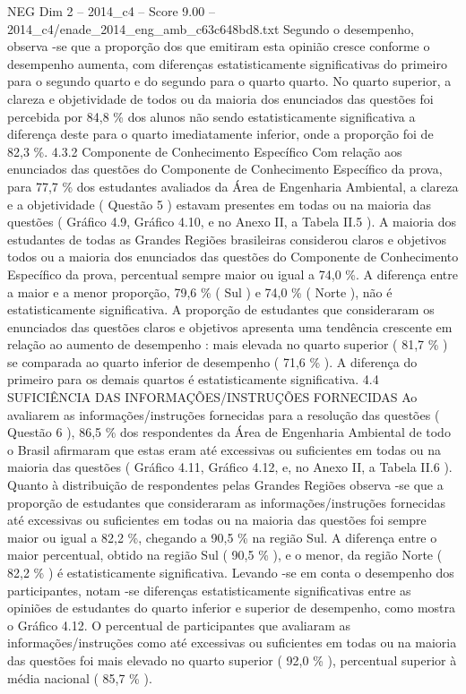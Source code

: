 \begin{textsample}{NEG Dim 2 – 2014\_c4 – Score 9.00 – 2014\_c4/enade\_2014\_eng\_amb\_c63c648bd8.txt}
Segundo o desempenho, observa -se que a proporção dos que emitiram esta opinião cresce conforme o desempenho aumenta, com diferenças estatisticamente significativas do primeiro para o segundo quarto e do segundo para o quarto quarto.
No quarto superior, a clareza e objetividade de todos ou da maioria dos enunciados das questões foi percebida por 84,8 \% dos alunos não sendo estatisticamente significativa a diferença deste para o quarto imediatamente inferior, onde a proporção foi de 82,3 \%. 4.3.2 Componente de Conhecimento Específico Com relação aos enunciados das questões do Componente de Conhecimento Específico da prova, para 77,7 \% dos estudantes avaliados da Área de Engenharia Ambiental, a clareza e a objetividade ( Questão 5 ) estavam presentes em todas ou na maioria das questões ( Gráfico 4.9, Gráfico 4.10, e no Anexo II, a Tabela II.5 ).
A maioria dos estudantes de todas as Grandes Regiões brasileiras considerou claros e objetivos todos ou a maioria dos enunciados das questões do Componente de Conhecimento Específico da prova, percentual sempre maior ou igual a 74,0 \%.
A diferença entre a maior e a menor proporção, 79,6 \% ( Sul ) e 74,0 \% ( Norte ), não é estatisticamente significativa.
A proporção de estudantes que consideraram os enunciados das questões claros e objetivos apresenta uma tendência crescente em relação ao aumento de desempenho : mais elevada no quarto superior ( 81,7 \% ) se comparada ao quarto inferior de desempenho ( 71,6 \% ).
A diferença do primeiro para os demais quartos é estatisticamente significativa. 4.4 SUFICIÊNCIA DAS INFORMAÇÕES/INSTRUÇÕES FORNECIDAS Ao avaliarem as informações/instruções fornecidas para a resolução das questões ( Questão 6 ), 86,5 \% dos respondentes da Área de Engenharia Ambiental de todo o Brasil afirmaram que estas eram até excessivas ou suficientes em todas ou na maioria das questões ( Gráfico 4.11, Gráfico 4.12, e, no Anexo II, a Tabela II.6 ).
Quanto à distribuição de respondentes pelas Grandes Regiões observa -se que a proporção de estudantes que consideraram as informações/instruções fornecidas até excessivas ou suficientes em todas ou na maioria das questões foi sempre maior ou igual a 82,2 \%, chegando a 90,5 \% na região Sul.
A diferença entre o maior percentual, obtido na região Sul ( 90,5 \% ), e o menor, da região Norte ( 82,2 \% ) é estatisticamente significativa.
Levando -se em conta o desempenho dos participantes, notam -se diferenças estatisticamente significativas entre as opiniões de estudantes do quarto inferior e superior de desempenho, como mostra o Gráfico 4.12.
O percentual de participantes que avaliaram as informações/instruções como até excessivas ou suficientes em todas ou na maioria das questões foi mais elevado no quarto superior ( 92,0 \% ), percentual superior à média nacional ( 85,7 \% ).

\end{textsample}
